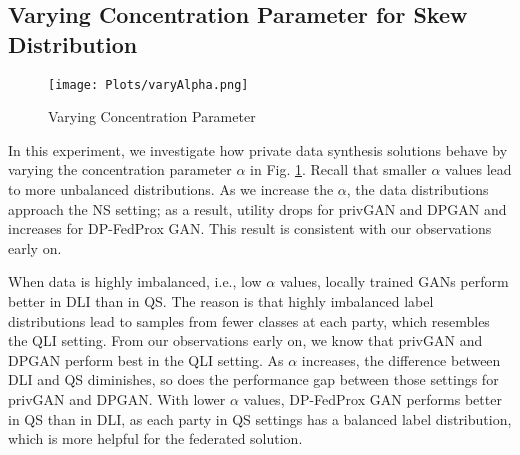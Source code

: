 \documentclass[conference]{IEEEtran}
\begin{document}
 


\subsection{Varying Concentration Parameter for Skew Distribution}
\begin{figure}[t]
 \centering
 \texttt{[image: Plots/varyAlpha.png]}
 \caption{Varying Concentration Parameter}
 \label{fig:varyAlpha}
\end{figure}

In this experiment, we investigate how private data synthesis solutions behave by varying the concentration parameter $\alpha$ in Fig. \ref{fig:varyAlpha}. Recall that smaller $\alpha$ values lead to more unbalanced distributions. As we increase the $\alpha$, the data distributions approach the NS setting; as a result, utility drops for privGAN and DPGAN and increases for DP-FedProx GAN.   This result is consistent with our observations early on.   %

When data is highly imbalanced, i.e., low $\alpha$ values, locally trained GANs perform better in DLI than in QS.  The reason is that highly imbalanced label distributions lead to samples from fewer classes at each party, which resembles the QLI setting.  From our observations early on, we know that privGAN and DPGAN perform best in the QLI setting.   As $\alpha$ increases, the difference between DLI and QS diminishes, so does the performance gap between those settings for privGAN and DPGAN.   With lower $\alpha$ values, DP-FedProx GAN performs better in QS than in DLI, as each party in QS settings has a balanced label distribution, which is more helpful for the federated solution.  
\end{document}
